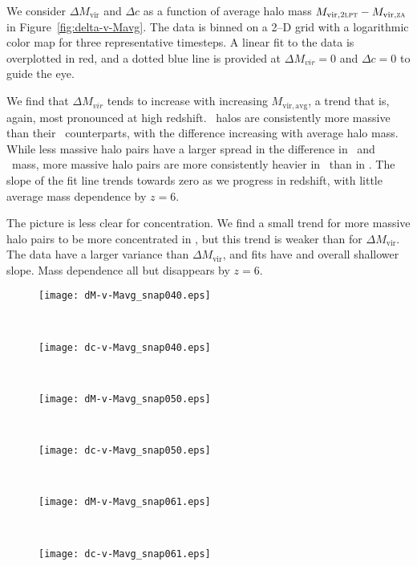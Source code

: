 We consider $\Delta M_{\mathrm{vir}}$ and $\Delta c$ as a function of average halo mass $M_{\mathrm{vir},\textsc{2lpt}} - M_{\mathrm{vir},\textsc{za}}$ in Figure~\ref{fig:delta-v-Mavg}.  The data is binned on a 2--D grid with a logarithmic color map for three representative timesteps.  A linear fit to the data is overplotted in red, and a dotted blue line is provided at $\Delta M_{vir} = 0$ and $\Delta c = 0$ to guide the eye.

We find that $\Delta M_{vir}$ tends to increase with increasing $M_{\mathrm{vir,avg}}$, a trend that is, again, most pronounced at high redshift.  \lpt\ halos are consistently more massive than their \za\ counterparts, with the difference increasing with average halo mass.  While less massive halo pairs have a larger spread in the difference in \lpt\ and \za\ mass, more massive halo pairs are more consistently heavier in \lpt\ than in \za.  The slope of the fit line trends towards zero as we progress in redshift, with little average mass dependence by $z = 6$.

The picture is less clear for concentration.  We find a small trend for more massive halo pairs to be more concentrated in \za, but this trend is weaker than for $\Delta M_{\mathrm{vir}}$.  The data have a larger variance than $\Delta M_{\mathrm{vir}}$, and fits have and overall shallower slope.  Mass dependence all but disappears by $z = 6$.

\begin{figure*}[t]
	\centering
	\begin{subfigure}{}
		\texttt{[image: dM-v-Mavg\_snap040.eps]}
	\end{subfigure}
	~
	\begin{subfigure}{}
		\texttt{[image: dc-v-Mavg\_snap040.eps]}
	\end{subfigure}
	\\
	\begin{subfigure}{}
		\texttt{[image: dM-v-Mavg\_snap050.eps]}
	\end{subfigure}
	~
	\begin{subfigure}{}
		\texttt{[image: dc-v-Mavg\_snap050.eps]}
	\end{subfigure}
	\\
	\begin{subfigure}{}
		\texttt{[image: dM-v-Mavg\_snap061.eps]}
	\end{subfigure}
	~
	\begin{subfigure}{}
		\texttt{[image: dc-v-Mavg\_snap061.eps]}
	\end{subfigure}
	\caption[$\Delta M_{\mathrm{vir}}$ and $\Delta c$ as a function of $M_{\mathrm{vir,avg}}$]{\footnotesize $\Delta M_{\mathrm{vir}}$ (left column) and $\Delta c$ (right column) as a function of $M_{\mathrm{vir,avg}}$.  Halos are counted in 2--D rectangular bins and smoothed with a Gaussian kernel with a logarithmic color scale.  The red line is the least-squares best fit to the data.  The blue dashed line at zero is provided to guide the eye.  The three rows again correspond to snapshots at $z = 14.7$, $z = 10.3$, and $z = 6.0$, respectively.}
	\label{fig:delta-v-Mavg}
\end{figure*}

